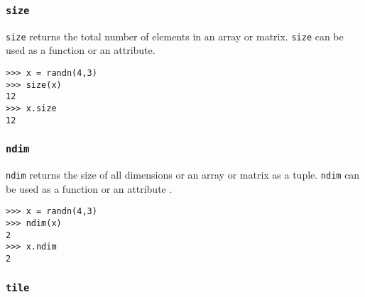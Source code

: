 \documentclass[KSmain.tex]{subfiles}
\begin{document}
\subsubsection{\texttt{size}}
\texttt{size} returns the total number of elements in an array or matrix. \texttt{size} can be used as a function or an
attribute.
\begin{framed}
\begin{verbatim}
>>> x = randn(4,3)
>>> size(x)
12
>>> x.size
12
\end{verbatim}
\end{framed}
\subsubsection{\texttt{ndim}}
\texttt{ndim} returns the size of all dimensions or an array or matrix as a tuple. \texttt{ndim} can be used as a function or
an attribute .
\begin{framed}
\begin{verbatim}
>>> x = randn(4,3)
>>> ndim(x)
2
>>> x.ndim
2
\end{verbatim}
\end{framed}
\subsubsection{\texttt{tile}}
\end{document}
